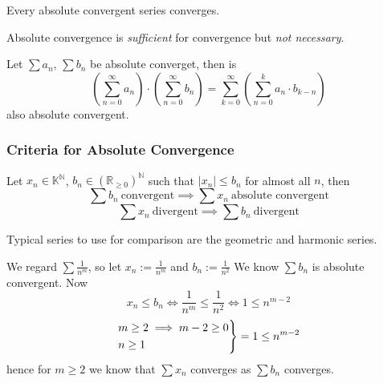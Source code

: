 \begin{theorem}
   Every absolute convergent series converges.
\end{theorem}
\begin{remark}
   Absolute convergence is \emph{sufficient} for convergence but \emph{not necessary}.
\end{remark}

\begin{theorem}
   Let \(\sum a_n\), \(\sum b_n\) be absolute converget, then is
   \[\left(\sum_{n=0}^\infty a_n\right) \cdot \left(\sum_{n=0}^\infty b_n\right) = \sum_{k=0}^\infty\left(\sum_{n=0}^k a_n \cdot b_{k-n}\right)\]
   also absolute convergent.
\end{theorem}

\newpage

\subsubsection{Criteria for Absolute Convergence}
\begin{proposition}\label{pro:comparison_test}
   Let \(x_n \in \mathbb{K}^\mathbb{N}\), \(b_n \in (\mathbb{R}_{\geq 0})^\mathbb{N}\) such that \(\lvert x_n\rvert \leq b_n\) for almost all \(n\), then
   \[\sum b_n~\text{convergent} \implies \sum x_n~\text{absolute convergent}\]
   \[\sum x_n~\text{divergent} \implies \sum b_n~\text{divergent}\]
\end{proposition}
\begin{remark}
   Typical series to use for comparison are the geometric and harmonic series.
\end{remark}
\begin{example}
   We regard \(\sum \frac{1}{n^m}\), so let \(x_n := \frac{1}{n^m}\) and \(b_n := \frac{1}{n^2}\)
   We know \(\sum b_n\) is absolute convergent.
   Now
   \[x_n \leq b_n \iff \frac{1}{n^m} \leq \frac{1}{n^2} \iff 1 \leq n^{m-2}\]
   \[\begin{drcases}m \geq 2 \implies m-2 \geq 0\\n \geq 1\end{drcases} = 1 \leq n^{m-2}\]
   hence for \(m \geq 2\) we know that \(\sum x_n\) converges as \(\sum b_n\) converges.
\end{example}

